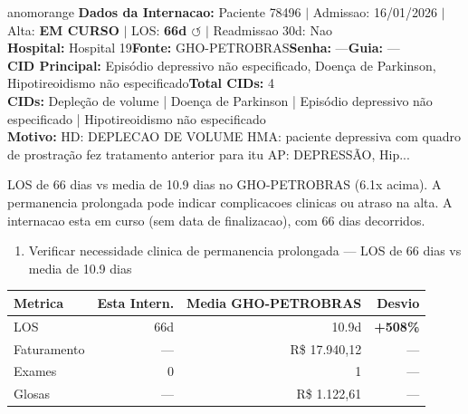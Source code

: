 \documentclass[a4paper,10pt]{article}
\begin{document}
\begin{anomalycard}[Internacao 162181 | GHO-PETROBRAS | ALTO (z=4.70)]{anomorange}
\textbf{Dados da Internacao:} Paciente 78496 $\mid$ Admissao: 16/01/2026 $\mid$ Alta: \textcolor{anomorange}{\textbf{EM CURSO}} $\mid$ LOS: \textbf{66d \textcolor{anomorange}{$\circlearrowleft$}} $\mid$ Readmissao 30d: Nao\\
\textbf{Hospital:} Hospital 19\quad\textbf{Fonte:} GHO-PETROBRAS\quad\textbf{Senha:} ---\quad\textbf{Guia:} ---\\
\textbf{CID Principal:} {\small Episódio depressivo não especificado, Doença de Parkinson, Hipotireoidismo não especificado}\quad\textbf{Total CIDs:} 4\\

\textbf{CIDs:} {\scriptsize Depleção de volume | Doença de Parkinson | Episódio depressivo não especificado | Hipotireoidismo não especificado}\\

\textbf{Motivo:} {\scriptsize HD: DEPLECAO DE VOLUME  HMA: paciente depressiva com quadro de prostração fez tratamento anterior para itu  AP: DEPRESSÃO, Hip...}\\

\vspace{2pt}\begin{tcolorbox}[colback=severityred!20,colframe=anomorange,title={\textbf{Interpretacao de Negocio}},fonttitle=\bfseries\small,left=4pt,right=4pt,top=3pt,bottom=3pt]
{\small LOS de 66 dias vs media de 10.9 dias no GHO-PETROBRAS (6.1x acima). A permanencia prolongada pode indicar complicacoes clinicas ou atraso na alta. A internacao esta em curso (sem data de finalizacao), com 66 dias decorridos.}
\end{tcolorbox}
\begin{tcolorbox}[colback=severityyellow!30,colframe=anomorange,title={\textbf{Recomendacoes Especificas}},fonttitle=\bfseries\small,left=4pt,right=4pt,top=3pt,bottom=3pt]
\begin{enumerate}[nosep,leftmargin=16pt]
\item {\small Verificar necessidade clinica de permanencia prolongada --- LOS de 66 dias vs media de 10.9 dias}
\end{enumerate}
\end{tcolorbox}
\begin{center}\begin{tabular}{l r r r}\toprule\textbf{Metrica} & \textbf{Esta Intern.} & \textbf{Media GHO-PETROBRAS} & \textbf{Desvio} \\\midrule
LOS & 66d & 10.9d & \textcolor{anomred}{\textbf{+508\%}} \\
Faturamento & --- & R\$ 17.940,12 & --- \\
Exames & 0 & 1 & --- \\
Glosas & --- & R\$ 1.122,61 & --- \\
\bottomrule\end{tabular}\end{center}


\end{anomalycard}
\end{document}
